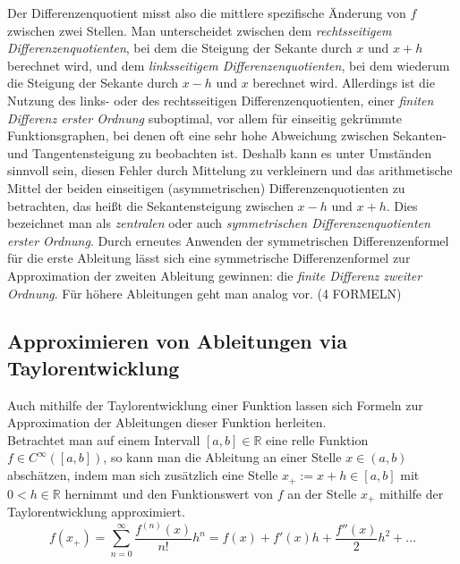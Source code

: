 \documentclass{scrartcl}
\begin{document}
Der Differenzenquotient misst also die mittlere spezifische Änderung von $f$ zwischen zwei Stellen. Man unterscheidet zwischen dem \textit{rechtsseitigem Differenzenquotienten}, bei dem die Steigung der Sekante durch $x$ und $x+h$ berechnet wird, und dem \textit{linksseitigem Differenzenquotienten}, bei dem wiederum die Steigung der Sekante durch $x-h$ und $x$ berechnet wird. Allerdings ist die Nutzung des links- oder des rechtsseitigen Differenzenquotienten, einer \textit{finiten Differenz erster Ordnung} suboptimal, vor allem für einseitig gekrümmte Funktionsgraphen, bei denen oft eine sehr hohe Abweichung zwischen Sekanten- und Tangentensteigung zu beobachten ist. Deshalb kann es unter Umständen sinnvoll sein, diesen Fehler durch Mittelung zu verkleinern und das arithmetische Mittel der beiden einseitigen (asymmetrischen) Differenzenquotienten zu betrachten, das heißt die Sekantensteigung zwischen $x-h$ und $x+h$. Dies bezeichnet man als \textit{zentralen} oder auch \textit{symmetrischen Differenzenquotienten erster Ordnung}. Durch erneutes Anwenden der symmetrischen Differenzenformel für die erste Ableitung lässt sich eine symmetrische Differenzenformel zur Approximation der zweiten Ableitung gewinnen: die \textit{finite Differenz zweiter Ordnung}. Für höhere Ableitungen geht man analog vor. (4 FORMELN) \\

\subsection{Approximieren von Ableitungen via Taylorentwicklung}
\label{ssec:herleitung2}
Auch mithilfe der Taylorentwicklung einer Funktion lassen sich Formeln zur Approximation der Ableitungen dieser Funktion herleiten.\\
Betrachtet man auf einem Intervall $[a,b]\in\mathbb{R}$ eine relle Funktion $f\in C^\infty([a,b])$, so kann man die Ableitung an einer Stelle $x\in(a,b)$ abschätzen, indem man sich zusätzlich eine Stelle $x_+ := x+h\in[a,b]$ mit $0<h\in\mathbb{R}$ hernimmt und den Funktionswert von $f$ an der Stelle $x_+$ mithilfe der Taylorentwicklung approximiert.
\[f(x_+)=\sum_{n=0}^{\infty}\frac{f^(n)(x)}{n!}h^n=f(x)+f'(x)h+\frac{f''(x)}{2}h^2+...\]
\end{document}
